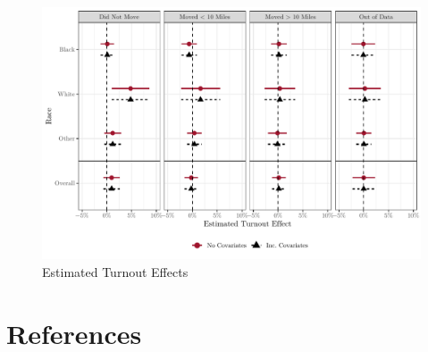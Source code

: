 \documentclass[
  12pt,
]{article}
\begin{document}
\begin{figure}[H]

{\centering \includegraphics{gentrification_files/figure-latex/to-2-1} 

}

\caption{\label{fig:local-turnout-plot}Estimated Turnout Effects}\label{fig:to-2}
\end{figure}

\newpage

\hypertarget{references}{%
\section*{References}\label{references}}
\end{document}
